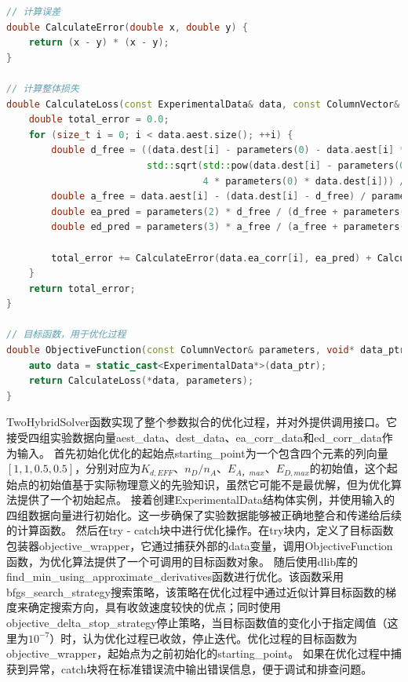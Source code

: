 \begin{lstlisting}[language=C++, caption={基于dlib的FRET双杂交求解器代码片段}]
// 计算误差
double CalculateError(double x, double y) {
    return (x - y) * (x - y);
}

// 计算整体损失
double CalculateLoss(const ExperimentalData& data, const ColumnVector& parameters) {
    double total_error = 0.0;
    for (size_t i = 0; i < data.aest.size(); ++i) {
        double d_free = ((data.dest[i] - parameters(0) - data.aest[i] * parameters(1)) +
                         std::sqrt(std::pow(data.dest[i] - parameters(0) - data.aest[i] * parameters(1), 2) +
                                   4 * parameters(0) * data.dest[i])) / 2;
        double a_free = data.aest[i] - (data.dest[i] - d_free) / parameters(1);
        double ea_pred = parameters(2) * d_free / (d_free + parameters(0));
        double ed_pred = parameters(3) * a_free / (a_free + parameters(0) / parameters(1));

        total_error += CalculateError(data.ea_corr[i], ea_pred) + CalculateError(data.ed_corr[i], ed_pred);
    }
    return total_error;
}

// 目标函数，用于优化过程
double ObjectiveFunction(const ColumnVector& parameters, void* data_ptr) {
    auto data = static_cast<ExperimentalData*>(data_ptr);
    return CalculateLoss(*data, parameters);
}
\end{lstlisting}

TwoHybridSolver函数实现了整个参数拟合的优化过程，并对外提供调用接口。它接受四组实验数据向量aest\_data、dest\_data、ea\_corr\_data和ed\_corr\_data作为输入。
首先初始化优化的起始点starting\_point为一个包含四个元素的列向量$[1, 1, 0.5, 0.5]$，分别对应为$K_{d,EFF}$、$n_D/n_A$、$E_{A，max}$、$E_{D,max}$的初始值，这个起始点的初始值基于实际物理意义的先验知识，虽然它可能不是最优解，但为优化算法提供了一个初始起点。
接着创建ExperimentalData结构体实例，并使用输入的四组数据向量进行初始化。这一步确保了实验数据能够被正确地整合和传递给后续的计算函数。
然后在try - catch块中进行优化操作。在try块内，定义了目标函数包装器objective\_wrapper，它通过捕获外部的data变量，调用ObjectiveFunction函数，为优化算法提供了一个可调用的目标函数对象。
随后使用dlib库的find\_min\_using\_approximate\_derivatives函数进行优化。该函数采用bfgs\_search\_strategy搜索策略，该策略在优化过程中通过近似计算目标函数的梯度来确定搜索方向，具有收敛速度较快的优点；同时使用objective\_delta\_stop\_strategy停止策略，当目标函数值的变化小于指定阈值（这里为$10^{-7}$）时，认为优化过程已收敛，停止迭代。优化过程的目标函数为objective\_wrapper，起始点为之前初始化的starting\_point。
如果在优化过程中捕获到异常，catch块将在标准错误流中输出错误信息，便于调试和排查问题。

